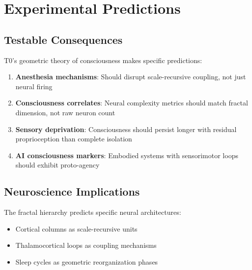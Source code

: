 	\section{Experimental Predictions}
	
	\subsection{Testable Consequences}
	
	T0's geometric theory of consciousness makes specific predictions:
	
	\begin{enumerate}
		\item \textbf{Anesthesia mechanisms}: Should disrupt scale-recursive coupling, not just neural firing
		\item \textbf{Consciousness correlates}: Neural complexity metrics should match fractal dimension, not raw neuron count
		\item \textbf{Sensory deprivation}: Consciousness should persist longer with residual proprioception than complete isolation
		\item \textbf{AI consciousness markers}: Embodied systems with sensorimotor loops should exhibit proto-agency
	\end{enumerate}
	
	\subsection{Neuroscience Implications}
	
	The fractal hierarchy predicts specific neural architectures:
	
	\begin{itemize}
		\item Cortical columns as scale-recursive units
		\item Thalamocortical loops as coupling mechanisms
		\item Sleep cycles as geometric reorganization phases
	\end{itemize}

